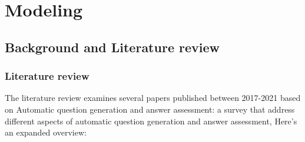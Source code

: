 \chapter{Modeling} 

\section{Background and Literature review}

\subsection{Literature review} 

The literature review examines several papers published between 2017-2021 based on Automatic question generation and answer assessment: a survey \cite{das2021automatic} that address different aspects of automatic question generation and answer assessment,   Here's an expanded overview:
